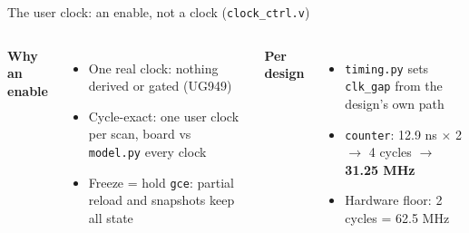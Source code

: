 \documentclass[aspectratio=169,11pt]{beamer}
\begin{document}
\begin{frame}{The user clock: an enable, not a clock (\texttt{clock\_ctrl.v})}
  \begin{columns}[T]
    \small\textbf{Why an enable}
    \scriptsize
    \begin{itemize}
      \item One real clock: nothing derived or gated (UG949)
      \item Cycle-exact: one user clock per scan, board vs \texttt{model.py} every clock
      \item Freeze = hold \texttt{gce}: partial reload and snapshots keep all state
    \end{itemize}
    \small\textbf{Per design}
    \scriptsize
    \begin{itemize}
      \item \texttt{timing.py} sets \texttt{clk\_gap} from the design's own path
      \item \texttt{counter}: 12.9 ns $\times$ 2 $\rightarrow$ 4 cycles $\rightarrow$ \textbf{31.25 MHz}
      \item Hardware floor: 2 cycles = 62.5 MHz
    \end{itemize}
  \end{columns}
\end{frame}
\end{document}
